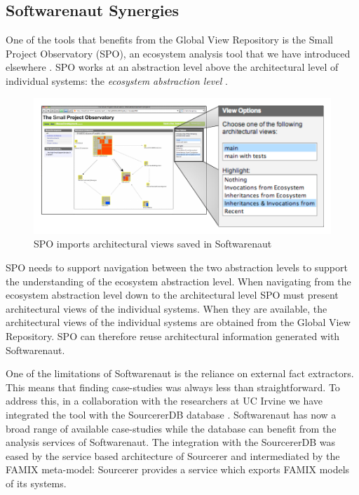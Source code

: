 \documentclass[preprint,12pt]{elsarticle}
\begin{document}
\subsection {Softwarenaut Synergies}

One of the tools that benefits from the Global View Repository is the Small Project Observatory (SPO), an ecosystem analysis tool that we have introduced elsewhere \cite{lungu-est}. SPO works at an abstraction level above the architectural level of individual systems: the {\em ecosystem abstraction level} \cite{lungu-thesis}. 

\begin{figure}[ht]
\begin{center}
\includegraphics[width=\linewidth]{SpoArchitectural}
\caption{SPO imports architectural views saved in Softwarenaut}
\label{}
\end{center}
\end{figure}

SPO needs to support navigation between the two abstraction levels to support the understanding of  the ecosystem abstraction level. When navigating from the ecosystem abstraction level down to the architectural level SPO must present architectural views of the individual systems. When they are available, the architectural views of the individual systems are obtained from the Global View Repository. SPO can therefore reuse architectural information generated with Softwarenaut.

One of the limitations of Softwarenaut is the reliance on external fact extractors. This means that finding case-studies was always less than straightforward. To address this, in a collaboration with the researchers at UC Irvine we have integrated the tool with the SourcererDB database \cite{linstead-sourcerer}. Softwarenaut has now a broad range of available case-studies while the database can benefit from the analysis services of Softwarenaut. The integration with the SourcererDB was eased by the service based architecture of Sourcerer and intermediated by the FAMIX meta-model: Sourcerer provides a service which exports FAMIX models of its systems. 
\end{document}
